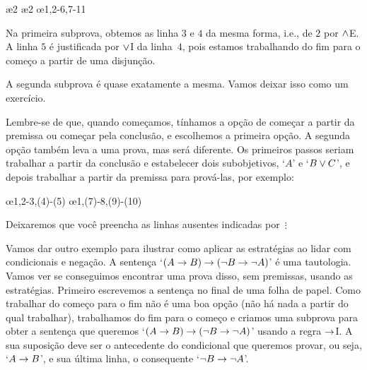 \begin{fitchproof}
	\open
	\ae{2}
	\ae{2}
	\close
	\open
	\ellipsesline
	\close
	\oe{1,2-6,7-11}
\end{fitchproof}
Na primeira subprova, obtemos as linha $3$ e $4$ da mesma forma, i.e.,  de $2$ por  $\wedge$E. A linha $5$  \'e justificada por $\vee$I da linha~$4$, pois estamos trabalhando do fim para o come\c co a partir de uma disjun\c c\~ao.

A segunda subprova \'e quase exatamente a mesma. Vamos deixar isso como um exerc\'icio.

Lembre-se de que, quando come\c camos, t\'inhamos a op\c c\~ao de come\c car a partir da premissa ou come\c car pela conclus\~ao, e escolhemos a primeira op\c c\~ao. A segunda op\c c\~ao tamb\'em leva a uma prova, mas ser\'a diferente. Os primeiros passos seriam trabalhar a partir da conclus\~ao e estabelecer dois subobjetivos, `$A$' e `$B \vee C$', e depois trabalhar a partir da premissa para prov\'a-las, por exemplo:
 

\begin{fitchproof}
	\open
	\ellipsesline
	\close
	\open
	\ellipsesline
	\close
	\oe{1,2-3,(4)-(5)}
	\open
	\ellipsesline
	\close
	\open
	\ellipsesline
	\close
	\oe{1,(7)-8,(9)-(10)}	
\end{fitchproof}
Deixaremos que voc\^e preencha as linhas ausentes indicadas por~$\vdots$

Vamos dar outro exemplo para ilustrar como aplicar as estrat\'egias ao lidar com condicionais e nega\c c\~ao. A senten\c ca `$(A \rightarrow B) \rightarrow (\neg B \rightarrow \neg A)$' \'e uma tautologia. 
Vamos ver se conseguimos encontrar uma prova disso, sem premissas, usando as estrat\'egias. Primeiro escrevemos a senten\c ca no final de uma folha de papel. Como trabalhar do come\c co para o fim n\~ao \'e uma boa op\c c\~ao (n\~ao h\'a nada a partir do qual trabalhar), trabalhamos do fim para o come\c co e criamos uma subprova para obter a  senten\c ca que queremos `$(A \rightarrow B) \rightarrow (\neg B \rightarrow \neg A)$' usando a regra  $\rightarrow$I. A sua suposi\c c\~ao deve ser o antecedente do condicional que queremos provar, ou seja, `$A \rightarrow B$', e sua \'ultima linha, o consequente `$\neg B \rightarrow \neg A$'.
 

